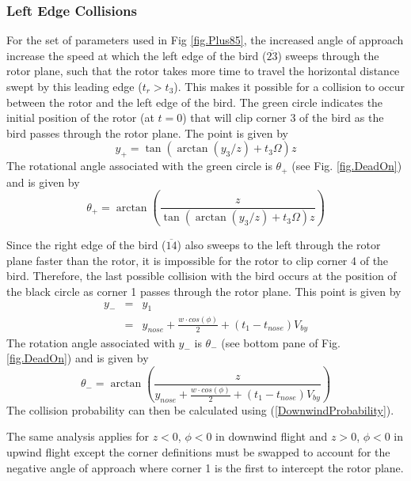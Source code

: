 \label{} \documentclass[10pt,conference]{IEEEtran}
\begin{document}
\subsubsection{Left Edge Collisions} For the set of parameters used in Fig \ref{fig.Plus85}, the increased angle of
approach increase the speed at which the left edge of the bird ($\overline{23}$) sweeps through the rotor plane, such
that the rotor takes more time to travel the horizontal distance swept by this leading edge ($t_r>t_3$). This makes it
possible for a collision to occur between the rotor and the left edge of the bird. The green circle indicates the
initial position of the rotor (at $t=0$) that will clip corner 3 of the bird as the bird passes through the rotor
plane. The point is given by
\begin{equation}
    y_+ = \tan(\arctan(y_3/z)+t_3\Omega)z
\end{equation}
The rotational angle associated with the green circle is $\theta_+$ (see Fig. \ref{fig.DeadOn}) and is given by
\begin{equation}
    \theta_+ = \arctan\left(\frac{z}{\tan(\arctan(y_3/z)+t_3\Omega)z}\right)
\end{equation}

Since the right edge of the bird ($\overline{14}$) also sweeps to the left through the rotor plane faster than the
rotor, it is impossible for the rotor to clip corner 4 of the bird. Therefore, the last possible collision with the
bird occurs at the position of the black circle as corner 1 passes through the rotor plane. This point is given by
\begin{eqnarray}
    \nonumber y_- &=& y_1\\
    &=& y_{nose}+\frac{w \cdot cos(\phi)}{2}+(t_1-t_{nose})V_{by}
\end{eqnarray}
The rotation angle associated with $y_-$ is $\theta_-$ (see bottom pane of Fig. \ref{fig.DeadOn}) and is given by
\begin{equation}
    \theta_- = \arctan \left(\frac{z}{y_{nose}+\frac{w \cdot cos(\phi)}{2}+(t_1-t_{nose})V_{by}}\right)
\end{equation}
The collision probability can then be calculated using (\ref{DownwindProbability}).

The same analysis applies for $z<0$, $\phi<0$ in downwind flight and $z>0$, $\phi<0$ in upwind flight except the corner
definitions must be swapped to account for the negative angle of approach where corner 1 is the first to intercept the
rotor plane.
\end{document}
